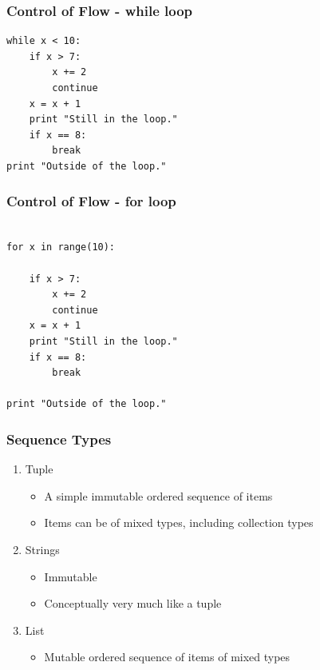 \documentclass[12pt,handout]{beamer}
\begin{document}
\begin{frame}[fragile]
\frametitle{Control of Flow - while loop}
\small{
\begin{verbatim}
while x < 10:
    if x > 7:
        x += 2
        continue
    x = x + 1
    print "Still in the loop."
    if x == 8:
        break
print "Outside of the loop."
\end{verbatim}
}
\end{frame}

\begin{frame}[fragile]
\frametitle{Control of Flow - for loop}
\small{
\begin{verbatim}

for x in range(10):
    
    if x > 7:
        x += 2
        continue
    x = x + 1
    print "Still in the loop."
    if x == 8:
        break

print "Outside of the loop."
\end{verbatim}
}
\end{frame}


\begin{frame}[fragile]
\frametitle{Sequence Types}
\begin{enumerate}
\item Tuple
\begin{itemize}
\item A simple immutable ordered sequence of items
\item Items can be of mixed types, including collection types
\end{itemize}
\item Strings
\begin{itemize}
\item Immutable
\item Conceptually very much like a tuple
\end{itemize}
\item List
\begin{itemize}
\item Mutable ordered sequence of items of mixed types
\end{itemize}
\end{enumerate}
\end{frame}
\end{document}
